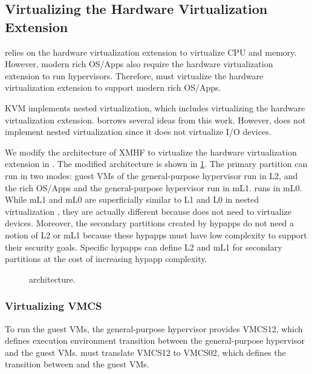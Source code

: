 \subsection{Virtualizing the Hardware Virtualization Extension}
\label{sec:design_nested_virt}

 relies on the hardware virtualization extension to virtualize CPU and memory. However, modern rich OS/Apps also require the hardware virtualization extension to run hypervisors. Therefore,  must virtualize the hardware virtualization extension to support modern rich OS/Apps.

KVM \cite{ben2010turtles} implements nested virtualization, which includes virtualizing the hardware virtualization extension.  borrows several ideas from this work. However,  does not implement nested virtualization since it does not virtualize I/O devices.

We modify the architecture of XMHF to virtualize the hardware virtualization extension in . The modified  architecture is shown in \ref{fig:xmhf64_arch}. The primary partition can run in two modes: guest VMs of the general-purpose hypervisor run in L2, and the rich OS/Apps and the general-purpose hypervisor run in mL1.  runs in mL0. While mL1 and mL0 are superficially similar to L1 and L0 in nested virtualization \cite{ben2010turtles}, they are actually different because  does not need to virtualize devices. Moreover, the secondary partitions created by hypapps do not need a notion of L2 or mL1 because these hypapps must have low complexity to support their security goals. Specific hypapps can define L2 and mL1 for secondary partitions at the cost of increasing hypapp complexity.

\begin{figure}[tbp]
	\begin{center}
	
	\end{center}
	\caption{ architecture.}
	\label{fig:xmhf64_arch}
\end{figure}

\subsubsection{Virtualizing VMCS}

To run the guest VMs, the general-purpose hypervisor provides VMCS12, which defines execution environment transition between the general-purpose hypervisor and the guest VMs.  must translate VMCS12 to VMCS02, which defines the transition between  and the guest VMs.

